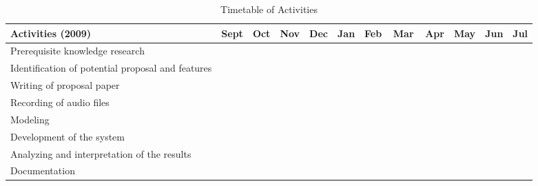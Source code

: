 \begin{table}[!]   %
	\setlength{\extrarowheight}{2pt}
	\setlength{\tabcolsep}{0.2em}
	\centering
	\caption{Timetable of Activities} \vspace{0.25em}
	\begin{tabular}{|p{2in}|c|c|c|c|c|c|c|c|c|c|c|} \hline
		\centering Activities (2009) & Sept & Oct & Nov & Dec & Jan & Feb & Mar & Apr & May & Jun & Jul\\ \hline
		Prerequisite knowledge research & ~~~\weektwo & ~~~\weektwo & & & & & & & & &\\ \hline
		Identification of potential proposal and features &  & \weektwo & \weekthree & & & & & & & &\\ \hline
		Writing of proposal paper     &   &  & \weekone & \weekfour & & & & & & &\\ \hline
		Recording of audio files    & & &  & & & \weektwo~~~ &  & & & &\\ \hline
		Modeling     &   &  &  & & & \weekone & \weekthree & \weekone & & &\\ \hline
		Development of the system &   &  &  &  &  &  & \weekone~~~~~ & \weekthree & \weektwo & \weekone &\\ \hline
		Analyzing and interpretation of the results & & & & & & & & & \weekthree & \weekone &\\ \hline
		Documentation & ~~~\weektwo  & \weekfour & \weekfour & \weekfour &  & \weekthree & \weekfour & \weekthree & \weekfour & \weekone & \weekone \\ \hline
	\end{tabular}
	\label{tab:timetableactivities}
\end{table}

